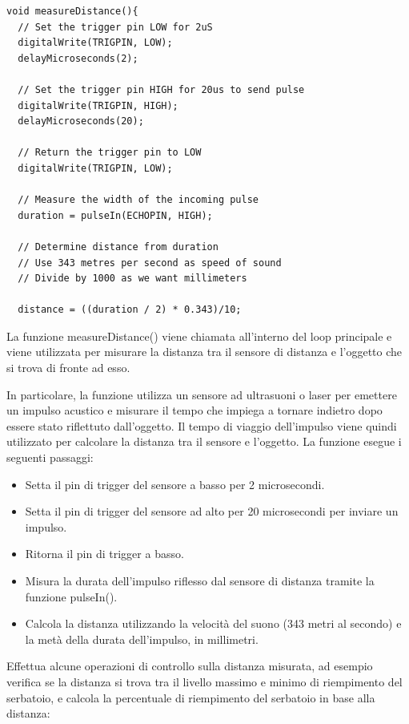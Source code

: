 \begin{multicols}{2}
\begin{verbatim}
void measureDistance(){
  // Set the trigger pin LOW for 2uS
  digitalWrite(TRIGPIN, LOW);
  delayMicroseconds(2);
 
  // Set the trigger pin HIGH for 20us to send pulse
  digitalWrite(TRIGPIN, HIGH);
  delayMicroseconds(20);
 
  // Return the trigger pin to LOW
  digitalWrite(TRIGPIN, LOW);
 
  // Measure the width of the incoming pulse
  duration = pulseIn(ECHOPIN, HIGH);
 
  // Determine distance from duration
  // Use 343 metres per second as speed of sound
  // Divide by 1000 as we want millimeters
 
  distance = ((duration / 2) * 0.343)/10;
\end{verbatim}

\columnbreak

La funzione measureDistance() viene chiamata all'interno del loop principale e viene utilizzata per misurare la distanza tra il sensore di distanza e l'oggetto che si trova di fronte ad esso.

In particolare, la funzione utilizza un sensore ad ultrasuoni o laser per emettere un impulso acustico e misurare il tempo che impiega a tornare indietro dopo essere stato riflettuto dall'oggetto. Il tempo di viaggio dell'impulso viene quindi utilizzato per calcolare la distanza tra il sensore e l'oggetto. La funzione esegue i seguenti passaggi:

\begin{itemize}
    \item Setta il pin di trigger del sensore a basso per 2 microsecondi.
    \item Setta il pin di trigger del sensore ad alto per 20 microsecondi per inviare un impulso.
    \item Ritorna il pin di trigger a basso.
    \item Misura la durata dell'impulso riflesso dal sensore di distanza tramite la funzione pulseIn().
    \item Calcola la distanza utilizzando la velocità del suono (343 metri al secondo) e la metà della durata dell'impulso, in millimetri.
\end{itemize}

\end{multicols}

Effettua alcune operazioni di controllo sulla distanza misurata, ad esempio verifica se la distanza si trova tra il livello massimo e minimo di riempimento del serbatoio, e calcola la percentuale di riempimento del serbatoio in base alla distanza:

